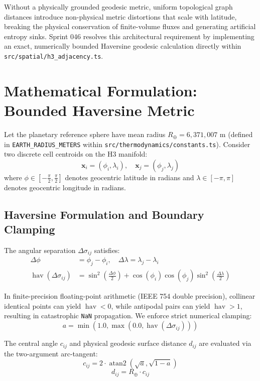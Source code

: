\documentclass[11pt,a4paper]{article}
\begin{document}
Without a physically grounded geodesic metric, uniform topological graph distances introduce non-physical metric distortions that scale with latitude, breaking the physical conservation of finite-volume fluxes and generating artificial entropy sinks. Sprint 046 resolves this architectural requirement by implementing an exact, numerically bounded Haversine geodesic calculation directly within \texttt{src/spatial/h3\_adjacency.ts}.

\section{Mathematical Formulation: Bounded Haversine Metric}

Let the planetary reference sphere have mean radius $R_\oplus = 6,371,007\text{ m}$ (defined in \texttt{EARTH\_RADIUS\_METERS} within \texttt{src/thermodynamics/constants.ts}). Consider two discrete cell centroids on the H3 manifold:
\begin{equation}
    \mathbf{x}_i = (\phi_i, \lambda_i), \quad \mathbf{x}_j = (\phi_j, \lambda_j)
\end{equation}
where $\phi \in [-\frac{\pi}{2}, \frac{\pi}{2}]$ denotes geocentric latitude in radians and $\lambda \in [-\pi, \pi]$ denotes geocentric longitude in radians.

\subsection{Haversine Formulation and Boundary Clamping}
The angular separation $\Delta\sigma_{ij}$ satisfies:
\begin{align}
    \Delta\phi &= \phi_j - \phi_i, \quad \Delta\lambda = \lambda_j - \lambda_i \\
    \operatorname{hav}(\Delta\sigma_{ij}) &= \sin^2\left(\frac{\Delta\phi}{2}\right) + \cos(\phi_i)\cos(\phi_j)\sin^2\left(\frac{\Delta\lambda}{2}\right)
\end{align}

In finite-precision floating-point arithmetic (IEEE 754 double precision), collinear identical points can yield $\operatorname{hav} < 0$, while antipodal pairs can yield $\operatorname{hav} > 1$, resulting in catastrophic \texttt{NaN} propagation. We enforce strict numerical clamping:
\begin{equation}
    a = \min\left(1.0, \max\left(0.0, \operatorname{hav}(\Delta\sigma_{ij})\right)\right)
\end{equation}

The central angle $c_{ij}$ and physical geodesic surface distance $d_{ij}$ are evaluated via the two-argument arc-tangent:
\begin{equation}
    c_{ij} = 2 \cdot \operatorname{atan2}\left(\sqrt{a}, \sqrt{1 - a}\right)
\end{equation}
\begin{equation}
    d_{ij} = R_\oplus \cdot c_{ij}
\end{equation}
\end{document}
